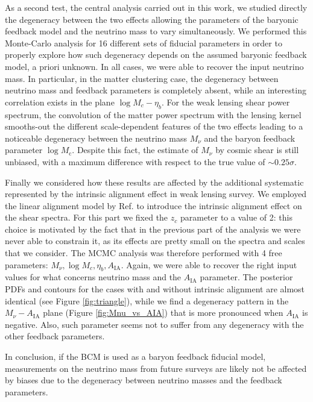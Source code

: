 \documentclass[a4paper,11pt]{article}
\def\logMc{\log M_{\mathrm c}}
\begin{document}
As a second test, the central analysis carried out in this work, we studied directly the degeneracy between the two effects allowing the parameters of the baryonic feedback model and the neutrino mass to vary simultaneously.
We performed this Monte-Carlo analysis for 16 different sets of fiducial parameters in order to properly explore how such degeneracy depends on the assumed baryonic feedback model, a priori unknown.
In all cases, we were able to recover the input neutrino mass.
In particular, in the matter clustering case, the degeneracy between neutrino mass and feedback parameters is completely absent, while an interesting correlation exists in the plane $\log M_c - \eta_b$.
For the weak lensing shear power spectrum, the convolution of the matter power spectrum with the lensing kernel smooths-out the different scale-dependent features of the two effects leading to a noticeable degeneracy between the neutrino mass $M_\nu$ and the baryon feedback parameter $\logMc$. Despite this fact, the estimate of $M_\nu$ by cosmic shear  is still unbiased, with a maximum difference with respect to the true value of $\sim 0.25 \sigma$.

Finally we considered how these results are affected by the additional systematic represented by the intrinsic alignment effect in weak lensing survey.
We employed the linear alignment model by Ref. \cite{Hirata-IA+04} to introduce the intrinsic alignment effect on the shear spectra. For this part we fixed the $z_c$ parameter to a value of 2: this choice is motivated by the fact that in the previous part of the analysis we were never able to constrain it, as its effects are pretty small on the spectra and scales that we consider. The MCMC analysis was therefore performed with 4 free parameters: $M_\nu, \log M_c, \eta_b, A_\mathrm{IA}$.
Again, we were able to recover the right input values for what concerns neutrino mass and the $A_\mathrm{IA}$ parameter.
The posterior PDFs and contours for the cases with and without intrinsic alignment are almost identical (see Figure \ref{fig:triangle}), while we find a degeneracy pattern in the $M_\nu-A_\mathrm{IA}$ plane (Figure \ref{fig:Mnu_vs_AIA}) that is more pronounced when $A_\mathrm{IA}$ is negative.
Also, such parameter seems not to suffer from any degeneracy with the other feedback parameters.

In conclusion, if the BCM is used as a baryon feedback fiducial model, measurements on the neutrino mass from future surveys are likely not be affected by biases due to the degeneracy between neutrino masses and the feedback parameters.
\end{document}
